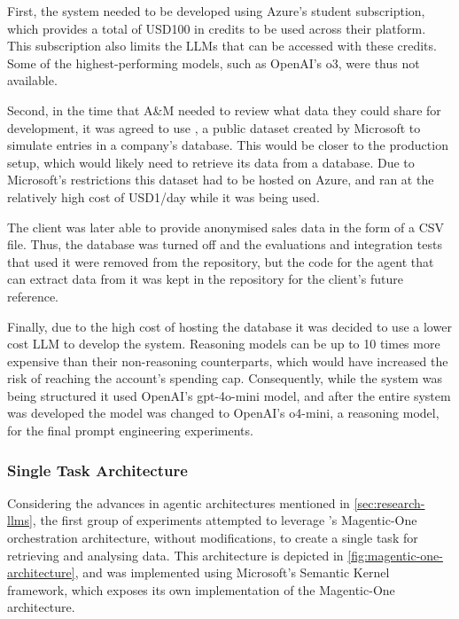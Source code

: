 \documentclass[a4paper]{report}
\begin{document}
First, the system needed to be developed using Azure's student subscription, which provides a total of USD100 in credits to be used across their platform. This subscription also limits the LLMs that can be accessed with these credits. Some of the highest-performing models, such as OpenAI's o3, were thus not available.

Second, in the time that A\&M needed to review what data they could share for development, it was agreed to use \cite{wideworldimporters2025}, a public dataset created by Microsoft to simulate entries in a company's database. This would be closer to the production setup, which would likely need to retrieve its data from a database. Due to Microsoft's restrictions this dataset had to be hosted on Azure, and ran at the relatively high cost of USD1/day while it was being used.

The client was later able to provide anonymised sales data in the form of a CSV file. Thus, the database was turned off and the evaluations and integration tests that used it were removed from the repository, but the code for the agent that can extract data from it was kept in the repository for the client's future reference.

Finally, due to the high cost of hosting the database it was decided to use a lower cost LLM to develop the system. Reasoning models can be up to 10 times more expensive than their non-reasoning counterparts, which would have increased the risk of reaching the account's spending cap. Consequently, while the system was being structured it used OpenAI's gpt-4o-mini model, and after the entire system was developed the model was changed to OpenAI's o4-mini, a reasoning model, for the final prompt engineering experiments.

\subsubsection{Single Task Architecture}

Considering the advances in agentic architectures mentioned in \autoref{sec:research-llms}, the first group of experiments attempted to leverage \cite{fourney2024magenticone}'s Magentic-One orchestration architecture, without modifications, to create a single task for retrieving and analysing data. This architecture is depicted in \autoref{fig:magentic-one-architecture}, and was implemented using Microsoft's Semantic Kernel framework, which exposes its own implementation of the Magentic-One architecture.
\end{document}
